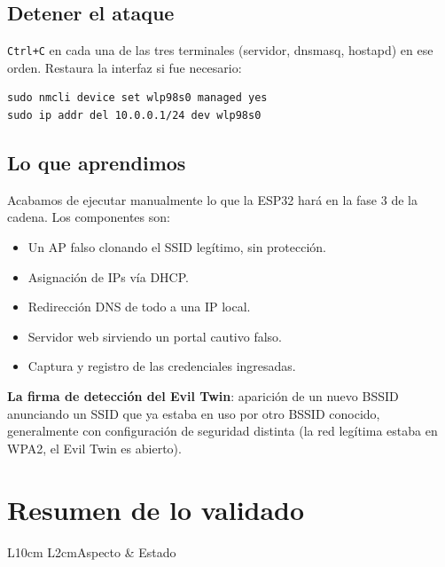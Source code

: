 \documentclass[11pt,a4paper]{article}
\begin{document}
\subsection{Detener el ataque}
\texttt{Ctrl+C} en cada una de las tres terminales (servidor, dnsmasq,
hostapd) en ese orden. Restaura la interfaz si fue necesario:

\begin{lstlisting}
sudo nmcli device set wlp98s0 managed yes
sudo ip addr del 10.0.0.1/24 dev wlp98s0
\end{lstlisting}

\subsection{Lo que aprendimos}
Acabamos de ejecutar manualmente lo que la ESP32 hará en la fase 3 de la
cadena. Los componentes son:

\begin{itemize}
  \item Un AP falso clonando el SSID legítimo, sin protección.
  \item Asignación de IPs vía DHCP.
  \item Redirección DNS de todo a una IP local.
  \item Servidor web sirviendo un portal cautivo falso.
  \item Captura y registro de las credenciales ingresadas.
\end{itemize}

\textbf{La firma de detección del Evil Twin}: aparición de un nuevo BSSID
anunciando un SSID que ya estaba en uso por otro BSSID conocido,
generalmente con configuración de seguridad distinta (la red legítima
estaba en WPA2, el Evil Twin es abierto).

\section{Resumen de lo validado}

\begin{datatable}{L{10cm} L{2cm}}{Aspecto & Estado}
\end{datatable}
\end{document}
